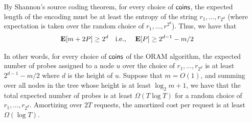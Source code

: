 By Shannon's source coding theorem, for every choice
of ${\sf coins}$, the expected length of the encoding 
must be at least the entropy
of the string $r_1, \ldots, r_{2^d}$ (where expectation
is taken over the random choice of $r_1, \ldots, r^{2^d}$). 
Thus, we have that 
\[
{\bf E}[m + 2 P] \geq 2^d \quad \text{i.e., }
\quad {\bf E}[P] \geq 2^{d-1}-m/2
\]

In other words, 
for every choice of ${\sf coins}$ of the ORAM algorithm, 
the expected number of probes assigned to a node $u$  
over the choice of $r_1, \ldots, r_{2^d}$
is at least $2^{d-1}-m/2$ where $d$ is the height of $u$. 
Suppose that $m = O(1)$, and summing over all nodes
in the tree whose height 
is at least $\log_2 m + 1$, 
we have that the total expected number of probes
is at least $\Omega(T \log T)$
for a random choice of $r_1, \ldots, r_{2^d}$.
Amortizing over $2T$ requests, the amortized cost
per request is at least $\Omega(\log T)$. 


